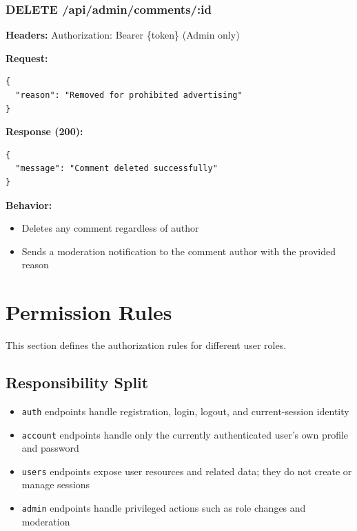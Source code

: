 \documentclass[11pt,a4paper]{article}
\begin{document}
\subsubsection{DELETE /api/admin/comments/:id}
\textbf{Headers:} Authorization: Bearer \{token\} (Admin only)

\textbf{Request:}
\begin{lstlisting}
{
  "reason": "Removed for prohibited advertising"
}
\end{lstlisting}

\textbf{Response (200):}
\begin{lstlisting}
{
  "message": "Comment deleted successfully"
}
\end{lstlisting}

\textbf{Behavior:}
\begin{itemize}
    \item Deletes any comment regardless of author
    \item Sends a moderation notification to the comment author with the provided reason
\end{itemize}

\section{Permission Rules}

This section defines the authorization rules for different user roles.

\subsection{Responsibility Split}
\begin{itemize}
    \item \texttt{auth} endpoints handle registration, login, logout, and current-session identity
    \item \texttt{account} endpoints handle only the currently authenticated user's own profile and password
    \item \texttt{users} endpoints expose user resources and related data; they do not create or manage sessions
    \item \texttt{admin} endpoints handle privileged actions such as role changes and moderation
\end{itemize}
\end{document}
